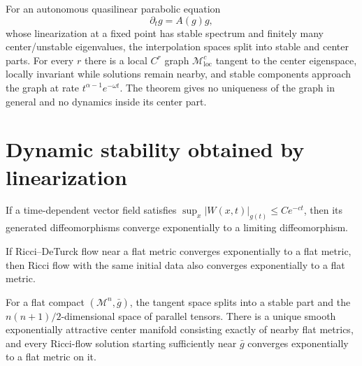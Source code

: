 \begin{theorem}
\label{thm:chow-iv-center-manifold}
For an autonomous quasilinear parabolic equation
\begin{equation*}
 \partial_tg=A(g)g,
 \tag{35.19}
\end{equation*}
whose linearization at a fixed point has stable spectrum and finitely many
center/unstable eigenvalues, the interpolation spaces split into stable and
center parts.  For every $r$ there is a local $C^r$ graph
$\mathcal M^c_{\mathrm{loc}}$ tangent to the center eigenspace, locally
invariant while solutions remain nearby, and stable components approach the
graph at rate $t^{\alpha-1}e^{-\omega t}$.  The theorem gives no uniqueness
of the graph in general and no dynamics inside its center part.
\end{theorem}

\section{Dynamic stability obtained by linearization}

\begin{lemma}
\label{lem:chow-iv-deturck-diffeomorphism-convergence}
If a time-dependent vector field satisfies
$\sup_x|W(x,t)|_{g(t)}\le Ce^{-ct}$, then its generated diffeomorphisms
converge exponentially to a limiting diffeomorphism.
\end{lemma}

\begin{corollary}
\label{cor:chow-iv-deturck-to-ricci-flow}
If Ricci--DeTurck flow near a flat metric converges exponentially to a flat
metric, then Ricci flow with the same initial data also converges exponentially
to a flat metric.
\end{corollary}

\begin{theorem}[Asymptotic stability at $\Rm=0$ (Theorem 35.30)]
\label{thm:chow-iv-flat-asymptotic-stability}
For a flat compact $(\mathcal M^n,\bar g)$, the tangent space splits into a
stable part and the $n(n+1)/2$-dimensional space of parallel tensors.  There
is a unique smooth exponentially attractive center manifold consisting exactly
of nearby flat metrics, and every Ricci-flow solution starting sufficiently
near $\bar g$ converges exponentially to a flat metric on it.
\end{theorem}

